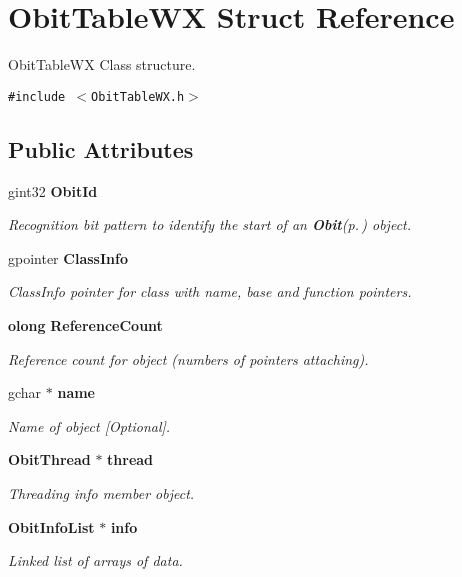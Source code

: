 \section{Obit\-Table\-WX Struct Reference}
\label{structObitTableWX}
Obit\-Table\-WX Class structure.  


{\tt \#include $<$Obit\-Table\-WX.h$>$}

\subsection*{Public Attributes}
\begin{CompactItemize}
\item 
gint32 {\bf Obit\-Id}
\begin{CompactList}\small\item\em Recognition bit pattern to identify the start of an {\bf Obit}{\rm (p.\,\pageref{structObit})} object. \item\end{CompactList}\item 
gpointer {\bf Class\-Info}
\begin{CompactList}\small\item\em Class\-Info pointer for class with name, base and function pointers. \item\end{CompactList}\item 
{\bf olong} {\bf Reference\-Count}
\begin{CompactList}\small\item\em Reference count for object (numbers of pointers attaching). \item\end{CompactList}\item 
gchar $\ast$ {\bf name}
\begin{CompactList}\small\item\em Name of object [Optional]. \item\end{CompactList}\item 
{\bf Obit\-Thread} $\ast$ {\bf thread}
\begin{CompactList}\small\item\em Threading info member object. \item\end{CompactList}\item 
{\bf Obit\-Info\-List} $\ast$ {\bf info}
\begin{CompactList}\small\item\em Linked list of arrays of data. \item\end{CompactList}\item 

\end{CompactItemize}
